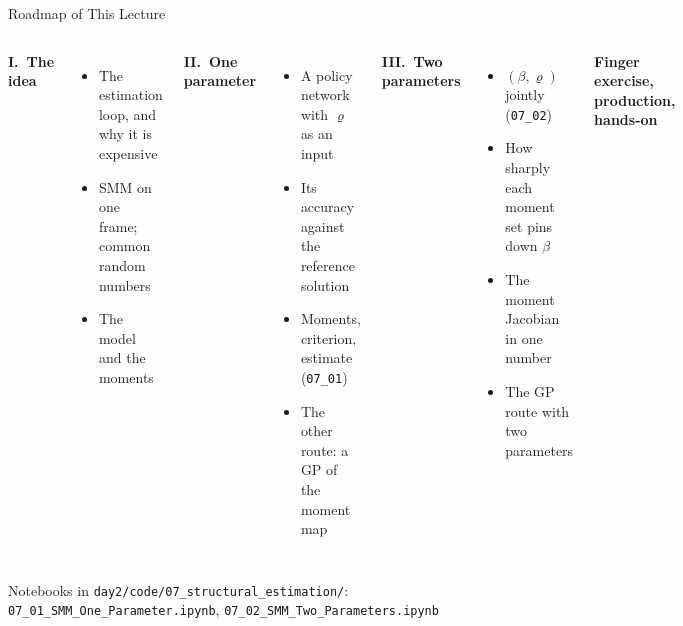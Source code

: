 \documentclass[aspectratio=169,11pt]{beamer}
\begin{document}
\begin{frame}{Roadmap of This Lecture}
\footnotesize
\begin{columns}[T]
\textbf{I.\ The idea}
\begin{itemize}\setlength\itemsep{1pt}
    \item The estimation loop, and why it is expensive
    \item SMM on one frame; common random numbers
    \item The model and the moments
\end{itemize}

\vspace{0.4em}
\textbf{II.\ One parameter}
\begin{itemize}\setlength\itemsep{1pt}
    \item A policy network with $\varrho$ as an input
    \item Its accuracy against the reference solution
    \item Moments, criterion, estimate (\texttt{07\_01})
    \item The other route: a GP of the moment map
\end{itemize}

\textbf{III.\ Two parameters}
\begin{itemize}\setlength\itemsep{1pt}
    \item $(\beta, \varrho)$ jointly (\texttt{07\_02})
    \item How sharply each moment set pins down $\beta$
    \item The moment Jacobian in one number
    \item The GP route with two parameters
\end{itemize}

\vspace{0.4em}
\textbf{Finger exercise, production, hands-on}
\end{columns}

\vspace{0.1em}
\begin{center}
{\scriptsize Notebooks in \texttt{day2/code/07\_structural\_estimation/}: \texttt{07\_01\_SMM\_One\_Parameter.ipynb}, \texttt{07\_02\_SMM\_Two\_Parameters.ipynb}}
\end{center}
\end{frame}
\end{document}
